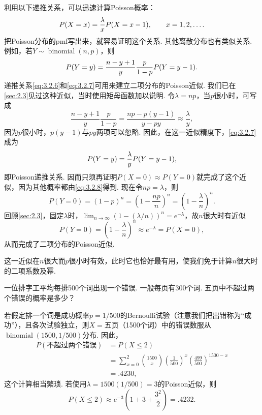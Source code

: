 利用以下递推关系，可以迅速计算Poisson概率：
\begin{equation}\label{eq:3.2.6}\index{SI0375@递推关系}
P(X=x)=\frac{\lambda}{x}P(X=x-1),\qquad x=1,2,\ldots.
\end{equation}
把Poisson分布的pmf写出来，就容易证明这个关系. 其他离散分布也有类似关系. 例如，若$Y\sim\operatorname{binomial}(n,p)$，则
\begin{equation}\label{eq:3.2.7}\index{SI0267@递推关系}
P(Y=y)=\frac{n-y+1}{y}\frac{p}{1-p}P(Y=y-1).
\end{equation}
递推关系\eqref{eq:3.2.6}和\eqref{eq:3.2.7}可用来建立二项分布的Poisson近似. 我们已在\autoref{sec:2.3}见过这种近似，当时使用矩母函数加以说明. 令$\lambda=np$，当$p$很小时，可写成
$$\frac{n-y+1}{y}\frac{p}{1-p}=\frac{np-p(y-1)}{y-py}\approx\frac{\lambda}{y},$$
因为$p$很小时，$p(y-1)$与$py$两项可以忽略. 因此，在这一近似精度下，\eqref{eq:3.2.7}成为
\begin{equation}\label{eq:3.2.8}\index{SI0060@以泊松近似二项}
P(Y=y)=\frac{\lambda}{y}P(Y=y-1),
\end{equation}
即Poisson递推关系. 因而只须再证明$P(X=0)\approx P(Y=0)$就完成了这个近似，因为其他概率都由\eqref{eq:3.2.8}得到. 现在令$np=\lambda$，则
$$P(Y=0)=(1-p)^n=\left(1-\frac{np}{n}\right)^n=\left(1-\frac{\lambda}{n}\right)^n.$$
回顾\autoref{sec:2.3}，固定$\lambda$时，$\lim_{n\to\infty}(1-(\lambda/n))^n=e^{-\lambda}$，故$n$很大时有近似
$$P(Y=0)=\left(1-\frac{\lambda}{n}\right)^n\approx e^{-\lambda}=P(X=0),$$
从而完成了二项分布的Poisson近似.

这一近似在$n$很大而$p$很小时有效，此时它也恰好最有用，使我们免于计算$n$很大时的二项系数及幂.

\begin{example}[Poisson近似]\label{ex:3.2.5}
一位排字工平均每排500个词出现一个错误. 一般每页有300个词. 五页中不超过两个错误的概率是多少？

若假定排一个词是成功概率$p=1/500$的Bernoulli试验（注意我们把出错称为“成功”），且各次试验独立，则$X=$五页（1500个词）中的错误数服从$\operatorname{binomial}(1500,1/500)$分布. 因此，
\begin{align*}
P(\text{不超过两个错误})&=P(X\le2)\\
&=\sum_{x=0}^2\binom{1500}{x}\left(\frac1{500}\right)^x\left(\frac{499}{500}\right)^{1500-x}\\
&=.4230,
\end{align*}
这个计算相当繁琐. 若使用$\lambda=1500(1/500)=3$的Poisson近似，则
$$P(X\le2)\approx e^{-3}\left(1+3+\frac{3^2}{2}\right)=.4232.$$
\end{example}


